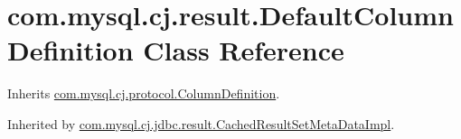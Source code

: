 \hypertarget{classcom_1_1mysql_1_1cj_1_1result_1_1_default_column_definition}{}\section{com.\+mysql.\+cj.\+result.\+Default\+Column\+Definition Class Reference}
\label{classcom_1_1mysql_1_1cj_1_1result_1_1_default_column_definition}


Inherits \mbox{\hyperlink{interfacecom_1_1mysql_1_1cj_1_1protocol_1_1_column_definition}{com.\+mysql.\+cj.\+protocol.\+Column\+Definition}}.



Inherited by \mbox{\hyperlink{classcom_1_1mysql_1_1cj_1_1jdbc_1_1result_1_1_cached_result_set_meta_data_impl}{com.\+mysql.\+cj.\+jdbc.\+result.\+Cached\+Result\+Set\+Meta\+Data\+Impl}}.

